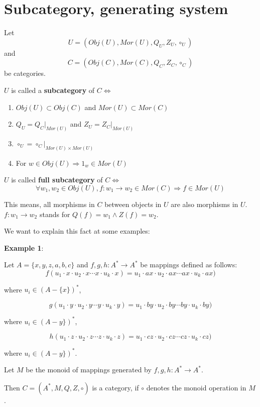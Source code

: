 \section{Subcategory, generating system}

\begin{definition}
Let \[ U = (Obj(U), Mor(U), Q_U, Z_U, \circ_U) \] and \[C = (Obj(C), Mor(C),
Q_C, Z_C, \circ_C)\] be categories.

$U$ is called a {\bf subcategory} of $C \Leftrightarrow$
\begin{enumerate}
  \item $Obj(U) \subset Obj(C)$ and $Mor(U) \subset Mor(C)$
  \item $Q_U = Q_C|_{Mor(U)}$ and $Z_U = Z_C|_{Mor(U)}$
  \item $\circ_U = \circ_C|_{Mor(U) \times Mor(U)}$
  \item For $w \in Obj(U) \Rightarrow 1_w \in Mor(U)$
\end{enumerate}
\end{definition}

$U$ is called {\bf full subcategory} of $C \Leftrightarrow$
\[ \forall w_1, w_2 \in Obj(U), f: w_1 \to w_2 \in Mor(C) \Rightarrow f \in
Mor(U) \]

This means, all morphisms in $C$ between objects in $U$ are also morphisms in
$U$. $f: w_1 \to w_2$ stands for $Q(f) = w_1 \wedge Z(f) = w_2$.

We want to explain this fact at some examples:

{\bf Example 1}:

Let $A = \{ x,y,z,a,b,c \}$ and $f, g, h: A^* \to A^*$ be mappings defined as
follows:
\[ f(u_1 \cdot x \cdot u_2 \cdot x \cdots x \cdot u_k \cdot x) = 
u_1 \cdot ax \cdot u_2 \cdot ax \cdots ax \cdot u_k \cdot ax) \]

where $u_i \in (A - \{x\})^*$,

\[ g(u_1 \cdot y \cdot u_2 \cdot y \cdots y \cdot u_k \cdot y) = 
u_1 \cdot by \cdot u_2 \cdot by \cdots by \cdot u_k \cdot by) \]

where $u_i \in (A - y\})^*$,

\[ h(u_1 \cdot z \cdot u_2 \cdot z \cdots z \cdot u_k \cdot z) = 
u_1 \cdot cz \cdot u_2 \cdot cz \cdots cz \cdot u_k \cdot cz) \]

where $u_i \in (A - y\})^*$.

Let $M$ be the monoid of mappings generated by $f, g, h : A^* \to A^*$.

Then $C = ({A^*}, M, Q, Z, \circ)$ is a category, if $\circ$ denotes the monoid
operation in $M$.

